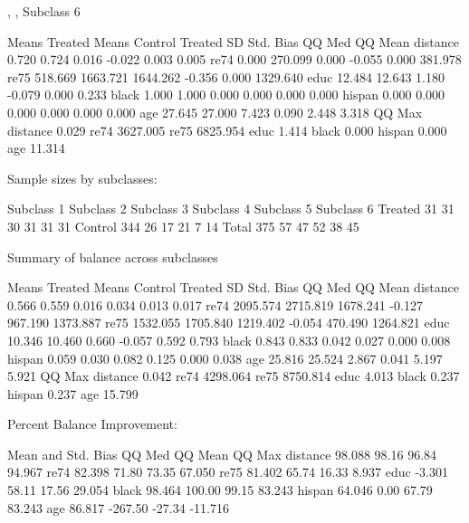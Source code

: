 \documentclass[oneside,letterpaper,titlepage]{article}
\begin{document}
\begin{enumerate}
\begin{Schunk}
\begin{Soutput}
, , Subclass 6

         Means Treated Means Control Treated SD Std. Bias    QQ Med   QQ Mean
distance         0.720         0.724      0.016    -0.022     0.003     0.005
re74             0.000       270.099      0.000    -0.055     0.000   381.978
re75           518.669      1663.721   1644.262    -0.356     0.000  1329.640
educ            12.484        12.643      1.180    -0.079     0.000     0.233
black            1.000         1.000      0.000     0.000     0.000     0.000
hispan           0.000         0.000      0.000     0.000     0.000     0.000
age             27.645        27.000      7.423     0.090     2.448     3.318
            QQ Max
distance     0.029
re74      3627.005
re75      6825.954
educ         1.414
black        0.000
hispan       0.000
age         11.314


Sample sizes by subclasses:

        Subclass 1 Subclass 2 Subclass 3 Subclass 4 Subclass 5 Subclass 6
Treated         31         31         30         31         31         31
Control        344         26         17         21          7         14
Total          375         57         47         52         38         45

Summary of balance across subclasses

         Means Treated Means Control Treated SD Std. Bias  QQ Med  QQ Mean
distance         0.566         0.559      0.016     0.034   0.013    0.017
re74          2095.574      2715.819   1678.241    -0.127 967.190 1373.887
re75          1532.055      1705.840   1219.402    -0.054 470.490 1264.821
educ            10.346        10.460      0.660    -0.057   0.592    0.793
black            0.843         0.833      0.042     0.027   0.000    0.008
hispan           0.059         0.030      0.082     0.125   0.000    0.038
age             25.816        25.524      2.867     0.041   5.197    5.921
           QQ Max
distance    0.042
re74     4298.064
re75     8750.814
educ        4.013
black       0.237
hispan      0.237
age        15.799

Percent Balance Improvement:

         Mean and Std. Bias  QQ Med QQ Mean  QQ Max
distance             98.088   98.16   96.84  94.967
re74                 82.398   71.80   73.35  67.050
re75                 81.402   65.74   16.33   8.937
educ                 -3.301   58.11   17.56  29.054
black                98.464  100.00   99.15  83.243
hispan               64.046    0.00   67.79  83.243
age                  86.817 -267.50  -27.34 -11.716
\end{Soutput}
\end{Schunk}


\end{enumerate}
\end{document}
